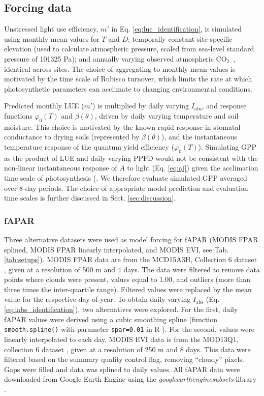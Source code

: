 \documentclass{myreport}
\newcommand{\coo}{CO$_2$}
\begin{document}
\subsection{Forcing data}
\label{sec:forcingdata}

Unstressed light use efficiency, $m'$ in Eq. \ref{eq:lue_identification}, is simulated using monthly mean values for $T$ and $D$; temporally constant site-specific elevation (used to calculate atmospheric pressure, scaled from sea-level standard pressure of 101325 Pa); and annually varying observed atmospheric \coo\ \citep{MacFarlingMeure2006}, identical across sites. The choice of aggregating to monthly mean values is motivated by the time scale of Rubisco turnover, which limits the rate at which photosynthetic parameters can acclimate to changing environmental conditions.

Predicted monthly LUE ($m'$) is multiplied by daily varying $I_\text{abs}$, and response functions $\varphi_0(T)$ and $\beta(\theta)$, driven by daily varying temperature and soil moisture. This choice is motivated by the known rapid response in stomatal conductance to drying soils (represented by $\beta(\theta)$), and the instantaneous temperature response of the quantum yield efficiency ($\varphi_0(T)$). Simulating GPP as the product of LUE and daily varying PPFD would not be consistent with the non-linear instantaneous response of $A$ to light (Eq. \ref{eq:aj}) given the acclimation time scale of photosynthesis (\citep{suzuki01, maire12po}. We therefore evaluate simulated GPP averaged over 8-day periods. The choice of appropriate model prediction and evaluation time scales is further discussed in Sect. \ref{sec:discussion}.  

\subsubsection{fAPAR}
\label{sec:greennessdata}

Three alternative datasets were used as model forcing for fAPAR (MODIS FPAR splined, MODIS FPAR linearly interpolated, and MODIS EVI, see Tab. \ref{tab:setups}). MODIS FPAR data are from the MCD15A3H, Collection 6 dataset \citep{modis_fpar_6}, given at a resolution of 500 m and 4 days. The  data were filtered to remove data points where clouds were present, values equal to 1.00, and outliers (more than three times the inter-quartile range). Filtered values were replaced by the mean value for the respective day-of-year. To obtain daily varying $I_\text{abs}$ (Eq. \ref{eq:iabs_identification}), two alternatives were explored. For the first, daily fAPAR values were derived using a cubic smoothing spline (function \texttt{smooth.spline()} with parameter \texttt{spar=0.01} in R \citep{Rcoreteam}). For the second, values were linearly interpolated to each day. MODIS EVI data is from the MOD13Q1, collection 6 dataset \citep{modis_evi_6}, given at a resolution of 250 m and 8 days. This data were filtered based on the summary quality control flag, removing ``cloudy'' pixels. Gaps were filled and data was splined to daily values. All fAPAR data were downloaded from Google Earth Engine using the \textit{google\textunderscore earth\textunderscore engine\textunderscore subsets} library \citep{gee_subset}. 
\end{document}
